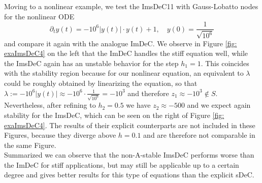 Moving to a nonlinear example, we test the ImsDeC11 with Gauss-Lobatto nodes for the nonlinear ODE
\begin{equation}\label{eq: ImsDeC_nonlinear_scalar}
\partial_t y(t)=-10^6 \lvert y(t) \rvert \cdot y(t)+1, \quad y(0)=\frac{1}{\sqrt{10^6}}
\end{equation} 
and compare it again with the analogue ImDeC. We observe in Figure \ref{fig: exaImsDeC4} on the left that the ImDeC handles the stiff equation well, while the ImsDeC again has an unstable behavior for the step $h_1=1$. This coincides with the stability region because for our nonlinear equation, an equivalent to $\lambda$ could be roughly obtained by linearizing the equation, so that $\lambda:=-10^6\lvert y(t) \rvert \approx -10^6\cdot \frac{1}{\sqrt{10^6}}=-10^3$ and therefore  $z_1\approx-10^3\notin S$. Nevertheless, after refining to $h_2=0.5$ we have $z_2\approx -500$ and we expect again stability for the ImsDeC, which can be seen on the right of Figure \ref{fig: exaImsDeC4}.
The results of their explicit counterparts are not included in these Figures, because they diverge above $h=0.1$ and are therefore not comparable in the same Figure. \\
Summarized we can observe that the non-A-stable ImsDeC performs worse than the ImDeC for stiff applications, but may still be applicable up to a certain degree and gives better results for this type of equations than the explicit sDeC.

